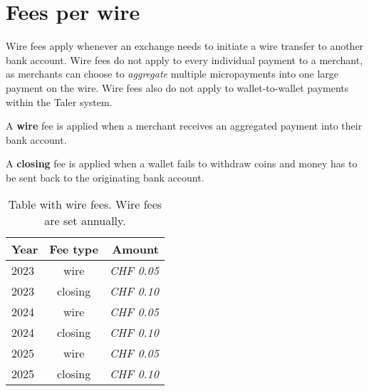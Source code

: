\section{Fees per wire} \label{sec:fees:wire}

Wire fees apply whenever an exchange needs to initiate a wire transfer to
another bank account.  Wire fees do not apply to every individual payment to a
merchant, as merchants can choose to {\em aggregate} multiple micropayments
into one large payment on the wire.  Wire fees also do not apply to
wallet-to-wallet payments within the Taler system.

A {\bf wire} fee is applied when a merchant receives
an aggregated payment into their bank account.

A {\bf closing} fee is applied when a wallet fails to
withdraw coins and money has to be sent back to the
originating bank account.

\begin{table}[h!]
  \caption{Table with wire fees. Wire fees are set annually.}
  \label{table:fees:wire}
  \begin{center}
    \begin{tabular}{l|c|r}
      {\bf Year} & {\bf Fee type} & {\bf Amount}   \\ \hline \hline
      2023       & wire           & {\em CHF 0.05} \\
      2023       & closing        & {\em CHF 0.10} \\
      2024       & wire           & {\em CHF 0.05} \\
      2024       & closing        & {\em CHF 0.10} \\
      2025       & wire           & {\em CHF 0.05} \\
      2025       & closing        & {\em CHF 0.10} \\
  \end{tabular}
  \end{center}
\end{table}

